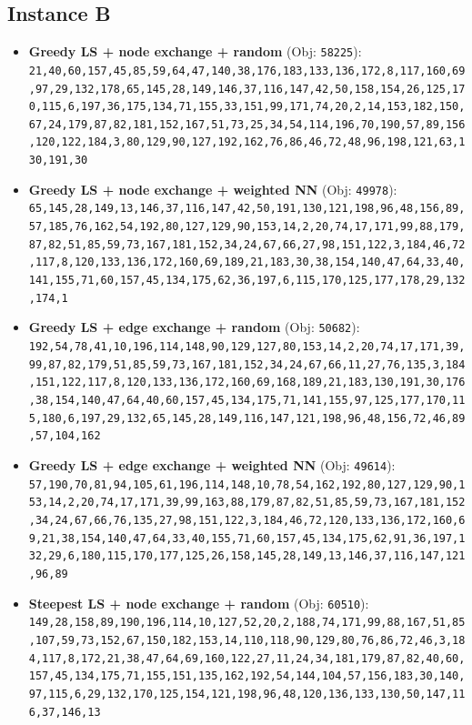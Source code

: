 \subsection{Instance B}
\begin{itemize}[leftmargin=1.5em]
    \item \textbf{Greedy LS + node exchange + random} (Obj: \texttt{58225}):\\
    \texttt{21,40,60,157,45,85,59,64,47,140,38,176,183,133,136,172,8,117,160,69,97,29,132,178,65,145,28,149,146,37,116,147,42,50,158,154,26,125,170,115,6,197,36,175,134,71,155,33,151,99,171,74,20,2,14,153,182,150,67,24,179,87,82,181,152,167,51,73,25,34,54,114,196,70,190,57,89,156,120,122,184,3,80,129,90,127,192,162,76,86,46,72,48,96,198,121,63,130,191,30}
    \item \textbf{Greedy LS + node exchange + weighted NN} (Obj: \texttt{49978}):\\
    \texttt{65,145,28,149,13,146,37,116,147,42,50,191,130,121,198,96,48,156,89,57,185,76,162,54,192,80,127,129,90,153,14,2,20,74,17,171,99,88,179,87,82,51,85,59,73,167,181,152,34,24,67,66,27,98,151,122,3,184,46,72,117,8,120,133,136,172,160,69,189,21,183,30,38,154,140,47,64,33,40,141,155,71,60,157,45,134,175,62,36,197,6,115,170,125,177,178,29,132,174,1}
    \item \textbf{Greedy LS + edge exchange + random} (Obj: \texttt{50682}):\\
    \texttt{192,54,78,41,10,196,114,148,90,129,127,80,153,14,2,20,74,17,171,39,99,87,82,179,51,85,59,73,167,181,152,34,24,67,66,11,27,76,135,3,184,151,122,117,8,120,133,136,172,160,69,168,189,21,183,130,191,30,176,38,154,140,47,64,40,60,157,45,134,175,71,141,155,97,125,177,170,115,180,6,197,29,132,65,145,28,149,116,147,121,198,96,48,156,72,46,89,57,104,162}
    \item \textbf{Greedy LS + edge exchange + weighted NN} (Obj: \texttt{49614}):\\
    \texttt{57,190,70,81,94,105,61,196,114,148,10,78,54,162,192,80,127,129,90,153,14,2,20,74,17,171,39,99,163,88,179,87,82,51,85,59,73,167,181,152,34,24,67,66,76,135,27,98,151,122,3,184,46,72,120,133,136,172,160,69,21,38,154,140,47,64,33,40,155,71,60,157,45,134,175,62,91,36,197,132,29,6,180,115,170,177,125,26,158,145,28,149,13,146,37,116,147,121,96,89}
    \item \textbf{Steepest LS + node exchange + random} (Obj: \texttt{60510}):\\
    \texttt{149,28,158,89,190,196,114,10,127,52,20,2,188,74,171,99,88,167,51,85,107,59,73,152,67,150,182,153,14,110,118,90,129,80,76,86,72,46,3,184,117,8,172,21,38,47,64,69,160,122,27,11,24,34,181,179,87,82,40,60,157,45,134,175,71,155,151,135,162,192,54,144,104,57,156,183,30,140,97,115,6,29,132,170,125,154,121,198,96,48,120,136,133,130,50,147,116,37,146,13}

\end{itemize}
